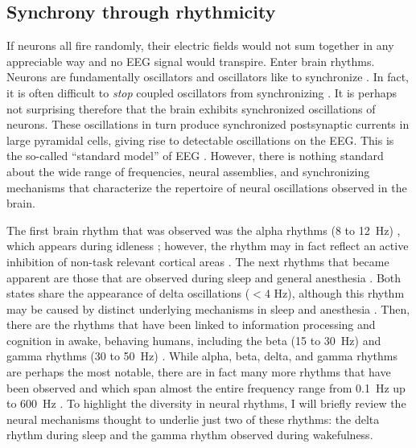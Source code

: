 \subsection{Synchrony through rhythmicity}
If neurons all fire randomly, their electric fields would not sum together in any appreciable way and no EEG signal would transpire. Enter brain rhythms. Neurons are fundamentally oscillators \cite{HODGKIN1952} and oscillators like to synchronize \cite{Strogatz2015}. In fact, it is often difficult to \textit{stop} coupled oscillators from synchronizing \cite{Erb1992}. It is perhaps not surprising therefore that the brain exhibits synchronized oscillations of neurons. These oscillations in turn produce synchronized postsynaptic currents in large pyramidal cells, giving rise to detectable oscillations on the EEG. This is the so-called ``standard model'' of EEG \cite{Cohen2017}. However, there is nothing standard about the wide range of frequencies, neural assemblies, and synchronizing mechanisms that characterize the repertoire of neural oscillations observed in the brain.

The first brain rhythm that was observed was the alpha rhythms (8 to \qty{12}{\hertz}) \cite{Berger1929}, which appears during idleness \cite{Adrian1934}; however, the rhythm may in fact reflect an active inhibition of non-task relevant cortical areas \cite{Cooper2003}. The next rhythms that became apparent are those that are observed during sleep \cite{Loomis1937,Weber2016} and general anesthesia \cite{GIBBS1937,Akeju2017}. Both states share the appearance of delta oscillations ($<4$ \unit{\hertz}), although this rhythm may be caused by distinct underlying mechanisms in sleep and anesthesia \cite{Akeju2017}. Then, there are the rhythms that have been linked to information processing and cognition in awake, behaving humans, including the beta (15 to \qty{30}{\hertz}) \cite{Spitzer2017} and gamma rhythms (30 to \qty{50}{\hertz}) \cite{JASPER1938,Fries2009}. While alpha, beta, delta, and gamma rhythms are perhaps the most notable, there are in fact many more rhythms that have been observed and which span almost the entire frequency range from \qty{0.1}{\hertz} up to \qty{600}{\hertz} \cite{Penttonen2003}. To highlight the diversity in neural rhythms, I will briefly review the neural mechanisms thought to underlie just two of these rhythms: the delta rhythm during sleep and the gamma rhythm observed during wakefulness.

